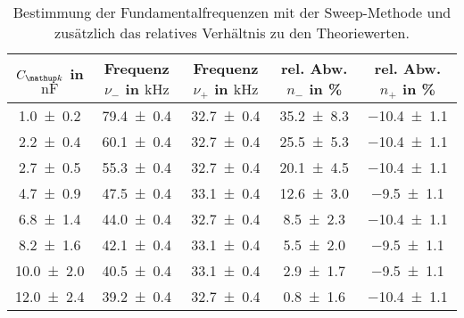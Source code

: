 \begin{table} 
\centering 
\caption{Bestimmung der Fundamentalfrequenzen mit der Sweep-Methode und zusätzlich das relatives Verhältnis zu den Theoriewerten.} 
\label{fig:teilc_schwingungen_prak_theo} 
\begin{tabular}{S S S S S } 
\toprule  
{$C\ua{k}$ in $\si{\nano\farad}$} & {Frequenz $\nu_-$ in $\si{\kilo\hertz}$} & {Frequenz $\nu_+$ in $\si{\kilo\hertz}$ }& {rel. Abw. $n_{-}$ in \%} & {rel. Abw. $n_+$ in \%}  \\ 
\midrule  
 \num{1.0\pm0.2} & \num{79.4\pm0.4} & \num{32.7\pm0.4} & \num{35.2\pm8.3} & \num{-10.4\pm1.1}\\ 
\num{2.2\pm0.4} & \num{60.1\pm0.4} & \num{32.7\pm0.4} & \num{25.5\pm5.3} & \num{-10.4\pm1.1}\\ 
\num{2.7\pm0.5} & \num{55.3\pm0.4} & \num{32.7\pm0.4} & \num{20.1\pm4.5} & \num{-10.4\pm1.1}\\ 
\num{4.7\pm0.9} & \num{47.5\pm0.4} & \num{33.1\pm0.4} & \num{12.6\pm3.0} & \num{-9.5\pm1.1}\\ 
\num{6.8\pm1.4} & \num{44.0\pm0.4} & \num{32.7\pm0.4} & \num{8.5\pm2.3} & \num{-10.4\pm1.1}\\ 
\num{8.2\pm1.6} & \num{42.1\pm0.4} & \num{33.1\pm0.4} & \num{5.5\pm2.0} & \num{-9.5\pm1.1}\\ 
\num{10.0\pm2.0} & \num{40.5\pm0.4} & \num{33.1\pm0.4} & \num{2.9\pm1.7} & \num{-9.5\pm1.1}\\ 
\num{12.0\pm2.4} & \num{39.2\pm0.4} & \num{32.7\pm0.4} & \num{0.8\pm1.6} & \num{-10.4\pm1.1}\\ 
\bottomrule 
\end{tabular} 
\end{table}
